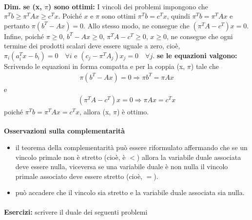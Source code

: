 \documentclass[a4paper, 11pt]{article}
\begin{document}
        \paragraph{}
        \textbf{Dim. }
        \textbf{se (x, $\pi$) sono ottimi: } I vincoli dei problemi impongono che $\pi^T b \geq \pi^T A x \geq c^T x$.
        Poiché $x$ e $\pi$ sono ottimi $\pi^T b = c^T x$, quindi $\pi^T b = \pi^T A x$ e pertanto
        $\pi(b^T - Ax) = 0$. Allo stesso modo, ne consegue che $(\pi^T A - c^T)x = 0$. Infine, poiché $\pi \geq 0$,
        $b^T - Ax \geq 0$, $\pi^T A - c^T \geq 0$, $x \geq 0$, ne consegue che ogni termine dei prodotti scalari deve essere uguale a zero, cioè, $\pi_i(a^T_i x - b_i) = 0 \quad \forall i$ e
        $(c_j - \pi^T A_j)x_j = 0 \quad \forall j$.
        \newline
        \textbf{se le equazioni valgono:  } Scrivendo le equazioni in forma compatta e per la coppia
        (x, $\pi$) tale che
        \begin{align*}
            \pi(b^T - Ax) = 0 \Rightarrow \pi b^T = \pi Ax
        \end{align*}
        e
        \begin{align*}
            (\pi^T A - c^T)x = 0 \Rightarrow \pi Ax = c^T x
        \end{align*}
        poiché $\pi^T b = \pi^T Ax = c^T x$, allora (x, $\pi$) è ottimo.
        
        \paragraph{}
        \textbf{Osservazioni sulla complementarità}

        \begin{itemize}
            \item il teorema della complementarità può essere riformulato affermando che se un vincolo primale non è stretto (cioè, è $<$) allora la variabile duale associata deve essere nulla, viceversa se una variabile duale è non nulla il vincolo primale associato deve essere stretto (cioè, $=$).
            \item può accadere che il vincolo sia stretto e la variabile duale associata sia nulla.
        \end{itemize}
        
        \paragraph{}
        \textbf{Esercizi:} scrivere il duale dei seguenti problemi 
        
\end{document}
